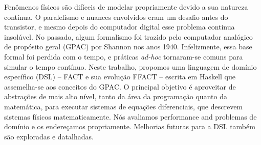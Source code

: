 
Fenômenos físicos são difíceis de modelar propriamente devido a sua natureza contínua. O paralelismo e nuances envolvidos eram um desafio
antes do transistor, e mesmo depois do computador digital esse problema continua insolúvel. No passado, algum formalismo foi trazido pelo
computador analógico de propósito geral (GPAC) por Shannon nos anos 1940. Infelizmente, essa base formal foi perdida com o tempo, e práticas
\textit{ad-hoc} tornaram-se comuns para simular o tempo contínuo. Neste trabalho, propomos uma linguagem de domínio específico (DSL) -- FACT e sua
evolução FFACT -- escrita
em Haskell que assemelha-se aos conceitos do GPAC. O principal objetivo é aproveitar de abstrações de mais alto nível, tanto da área da programação quanto
da matemática, para executar sistemas de equações diferenciais, que descrevem sistemas físicos matematicamente. Nós avaliamos performance and problemas de
domínio e os endereçamos propriamente. Melhorias futuras para a DSL também são exploradas e datalhadas.

